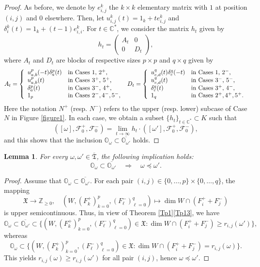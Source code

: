 \documentclass[11pt]{article}
\newtheorem{lemma}[theo]{Lemma}
\theoremstyle{definition}
\numberwithin{equation}{section}
\newcommand{\flag}{\mathcal{F}}
\newcommand{\Xorbit}{\mathbb{O}}
\newcommand{\ppermutationsof}{\mathfrak{T}}
\newcommand{\parameters}{\overline{\ppermutationsof}}
\newcommand{\Xfv}{\mathfrak{X}}
\newcommand{\mC}{\mathbb{C}}
\begin{document}
\begin{proof}
As before, we denote by $e_{i,j}^k$ the $k\times k$ elementary matrix
with $1$ at position $(i,j)$ and $0$ elsewhere.
Then, let $u_{i,j}^k(t)=1_k+te_{i,j}^k$ and $\delta_i^k(t)=1_k+(t-1)e_{i,i}^k$.
For $t\in\mC^*$, we consider the matrix $h_t$ given by
\[h_t=\begin{pmatrix} A_t & 0\\ 0 & D_t \end{pmatrix},\]
where $A_t$ and $D_t$ are blocks of respective sizes $p\times p$ and $q\times q$ given by
\[
A_t=\left\{
\begin{array}{ll}
u_{a,b}^p(-t)\delta^p_a(t) & \mbox{in Cases 1, $2^+$,}\\
u_{a,b}^p(t) & \mbox{in Cases $3^+$, $5^+$,}\\
\delta_a^p(t) & \mbox{in Cases $3^-$, $4^+$,}\\
1_p & \mbox{in Cases $2^-$,\,$4^-$,\,$5^-$,}
\end{array}
\right.
\
D_t=\left\{
\begin{array}{ll}
u^q_{c,d}(t)\delta^q_c(-t) & \mbox{in Cases 1, $2^-$,}\\
u_{c,d}^q(t) & \mbox{in Cases $3^-$, $5^-$,}\\
\delta_c^q(t) & \mbox{in Cases $3^+$, $4^-$,}\\
1_q & \mbox{in Cases $2^+$,\,$4^+$,\,$5^+$.}
\end{array}
\right.
\]
Here the notation $N^+$ (resp. $N^-$) refers to the upper (resp. lower) subcase of Case $N$ in Figure \ref{figure1}.
In each case, we obtain a subset $\{h_t\}_{t\in\mC^*}\subset K$ such that
\[([\omega],\flag_0^+,\flag_0^-)=\lim_{t\to \infty}h_t\cdot([\omega'],\flag_0^+,\flag_0^-),\]
and this shows that the inclusion $\Xorbit_\omega\subset\overline{\Xorbit_{\omega'}}$ holds.
\end{proof}

\begin{lemma}
\label{L3.5}
For every $\omega,\omega'\in\parameters$, the following implication holds:
\[\Xorbit_\omega\subset\overline{\Xorbit_{\omega'}}\quad\Longrightarrow\quad \omega\preceq\omega'.\]
\end{lemma}

\begin{proof}
Assume that $\Xorbit_\omega\subset\overline{\Xorbit_{\omega'}}$. For each pair $(i,j)\in\{0,\ldots,p\}\times\{0,\ldots,q\}$, the mapping
\[
\Xfv\to\mathbb{Z}_{\geq 0},\quad (W,(F^+_k)_{k=0}^p,(F^-_\ell)_{\ell=0}^q)\mapsto \dim W\cap(F_i^++F_j^-)
\]
is upper semicontinuous. Thus, in view of Theorem \ref{Tp1}\ref{Tp13}, we have
\[
\Xorbit_\omega\subset \overline{\Xorbit_{\omega'}}\subset\{(W,(F^+_k)_{k=0}^p,(F^-_\ell)_{\ell=0}^q)\in\Xfv:\dim W\cap (F_i^++F_j^-)\geq r_{i,j}(\omega')\},
\]
whereas
\[
\Xorbit_\omega\subset\{(W,(F^+_k)_{k=0}^p,(F^-_\ell)_{\ell=0}^q)\in\Xfv:\dim W\cap (F_i^++F_j^-)=r_{i,j}(\omega)\}.
\]
This yields $r_{i,j}(\omega)\geq r_{i,j}(\omega')$ for all pair $(i,j)$, hence $\omega\preceq\omega'$.
\end{proof}
\end{document}
